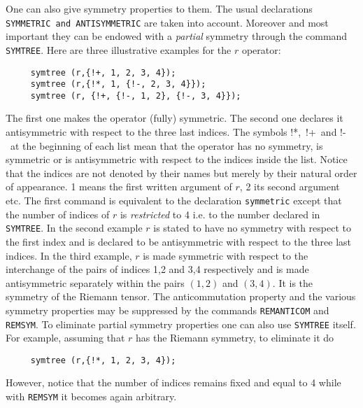 One can also give symmetry properties to them. The usual declarations
{\tt SYMMETRIC and AN\-TI\-SYM\-ME\-TRIC} are taken into account. Moreover
and most important they can be endowed with a {\em partial} symmetry 
through the command {\tt SYMTREE}.
Here are three illustrative examples for the $r$ operator:
\begin{verbatim}
     symtree (r,{!+, 1, 2, 3, 4});
     symtree (r,{!*, 1, {!-, 2, 3, 4}});
     symtree (r, {!+, {!-, 1, 2}, {!-, 3, 4}});
\end{verbatim}
The first one makes the operator (fully) symmetric.
The second one declares it antisymmetric with respect 
to the three last indices. 
The symbols !*,\  !+\  and !-\  at the beginning of each list mean that
the operator has no symmetry, is symmetric or is antisymmetric with respect
to the indices inside the list. Notice that the indices are not denoted
by their names but merely by their natural order of appearance. 1 means the
first written argument of $r$, 2 its second argument etc.
The first command is equivalent to the declaration {\tt symmetric}
except that the number of indices of $r$ is {\em restricted} to 
4 i.e. to the number declared in {\tt SYMTREE}.
In the second example $r$  is stated to have no symmetry with respect 
to the  first index and is declared  to be antisymmetric with respect 
to the three last indices. In the third example, $r$ is made symmetric 
with respect to the interchange  of the pairs of indices 1,2 
and 3,4 respectively and is made antisymmetric separately within
the pairs $(1,2)$ and $(3,4)$. It is the symmetry of the Riemann tensor.
The anticommutation property and the various 
symmetry properties may be suppressed by the commands {\tt REMANTICOM} and 
{\tt REMSYM}. To eliminate partial symmetry properties one can also use 
{\tt SYMTREE}  itself. For example, assuming that $r$ has the Riemann symmetry,
to eliminate it do 
\begin{verbatim}
     symtree (r,{!*, 1, 2, 3, 4});  
\end{verbatim}
However, notice that the number of indices remains fixed and equal to 4
while with {\tt REMSYM} it becomes again arbitrary.
